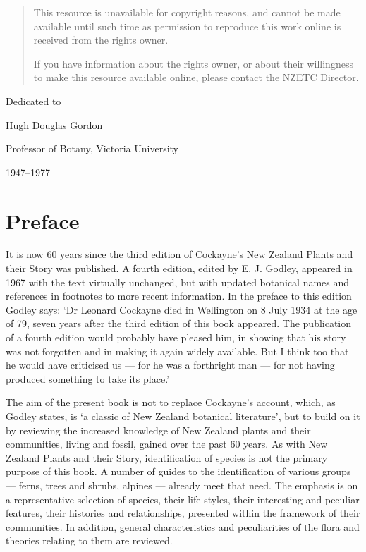 \markboth{}{}
\begin{quote}
    This resource is unavailable for copyright reasons, and cannot be made available until such time as permission to reproduce this work online is received from the rights owner.

    If you have information about the rights owner, or about their willingness to make this resource available online, please contact the NZETC Director.
\end{quote}

Dedicated to\par
Hugh Douglas Gordon\par
Professor of Botany, Victoria University\par
1947–1977

\chapter*{Preface}

It is now 60 years since the third edition of Cockayne's New Zealand Plants and their Story was published. A fourth edition, edited by E. J. Godley, appeared in 1967 with the text virtually unchanged, but with updated botanical names and references in footnotes to more recent information. In the preface to this edition Godley says: `Dr Leonard Cockayne died in Wellington on 8 July 1934 at the age of 79, seven years after the third edition of this book appeared. The publication of a fourth edition would probably have pleased him, in showing that his story was not forgotten and in making it again widely available. But I think too that he would have criticised us --- for he was a forthright man --- for not having produced something to take its place.'

The aim of the present book is not to replace Cockayne's account, which, as Godley states, is `a classic of New Zealand botanical literature', but to build on it by reviewing the increased knowledge of New Zealand plants and their communities, living and fossil, gained over the past 60 years. As with New Zealand Plants and their Story, identification of species is not the primary purpose of this book. A number of guides to the identification of various groups --- ferns, trees and shrubs, alpines --- already meet that need. The emphasis is on a representative selection of species, their life styles, their interesting and peculiar features, their histories and relationships, presented within the framework of their communities. In addition, general characteristics and peculiarities of the flora and theories relating to them are reviewed.

